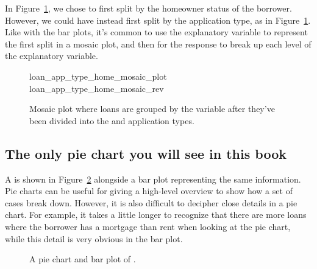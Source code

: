 In Figure~\ref{loan_app_type_home_mosaic_rev},
we chose to first split by the homeowner status
of the borrower.
However, we could have instead first split by
the application type, as in
Figure~\ref{loan_app_type_home_mosaic_rev}.
Like with the bar plots, it's common to use
the explanatory variable to represent the
first split in a mosaic plot,
and then for the response to break
up each level of the explanatory variable.

\begin{figure}[h]
  \centering
      {loan_app_type_home_mosaic_plot}
      {loan_app_type_home_mosaic_rev}
  \caption{Mosaic plot where loans are grouped by
      the  variable after they've
      been divided into the  and
       application types.}
  \label{loan_app_type_home_mosaic_rev}
\end{figure}



\subsection{The only pie chart you will see in this book}


A  is shown in
Figure~\ref{loan_homeownership_pie_chart} alongside
a bar plot representing the same information.
Pie charts can be useful for giving a high-level overview
to show how a set of cases break down.
However, it is also difficult to decipher close details
in a pie chart.
For example, it takes a little longer to recognize
that there are more loans where the borrower has
a mortgage than rent when looking at the pie chart,
while this detail is very obvious in the bar plot.

\begin{figure}[h]
  \centering
  \caption{A pie chart and bar plot of .}
  \label{loan_homeownership_pie_chart}
\end{figure}

